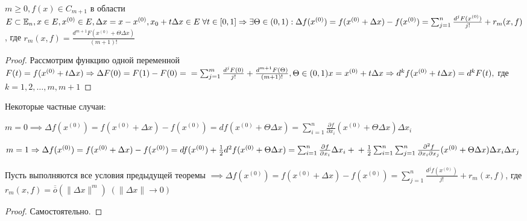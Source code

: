 \documentclass[../main.tex]{subfiles}
\begin{document}
\begin{theorem}
    $m\geqslant 0, f(x)\in C_{m+1}$ в области $E \subset \E_{n}, x\in E, x^{(0)}\in E, \Delta x = x- x^{(0)}, x_{0}+t\Delta x \in E \; \forall t \in [0,1] \\ \implies \exists \Theta \in (0,1): \Delta f(x^{(0)}) = f(x^{(0)}+ \Delta x) - f(x^{(0)}) = \sum_{j=1}^{n} \frac{d^{j}F(x^{(0)})}{j!}+ r_{m}(x,f)$, где $r_{m}(x,f) = \frac{d^{m+1}F(x^{(0)}+\Theta\Delta x)}{(m+1)!}$ 
\end{theorem}
\begin{proof}
    Рассмотрим функцию одной переменной $F(t) = f(x^{(0)}+t\Delta x) \implies \Delta F(0) = F(1)-F(0) =\\= \sum_{j=1}^{m}\frac{d^{j}F(0)}{j!}+ \frac{d^{m+1}F(\Theta)}{(m+1)!},\Theta \in (0,1)\\ x = x^{(0)}+t\Delta x \implies d^{k}f(x^{(0)}+t\Delta x) = d^{k}F(t),$ где $k=1,2,\dots,m,m+1$
\end{proof}
Некоторые частные случаи: 

\noindent $m=0\implies \Delta f(x^{(0)})=f(x^{(0)}+\Delta x)-f(x^{(0)})=df(x^{(0)}+\Theta \Delta x)= \sum_{i    =1}^{n  }\frac{\partial{f}}{\partial{x_{i}}}(x^{(0)}+ \Theta \Delta x)\Delta x_{i} $

\noindent $m=1\implies \Delta f(x^{(0)})=f(x^{(0)}+\Delta x)-f(x^{(0)})=df(x^{(0)})+ \frac{1}{2}d^{2}f(x^{(0)}+\Theta \Delta x) = \sum_{i   =1}^{n  } \frac{\partial{f}}{\partial{x_{i}}}\Delta x_{i}+\\+ \frac{1}{2} \sum_{i  =1}^{n} \sum_{j=1}^{n} \frac{\partial^{2}{f}}{\partial{x_{i}}\partial{x_{j}}} (x^{(0)}+\Theta \Delta x) \Delta x_{i} \Delta x_{j} $  

\begin{corollary}
    Пусть выполняются все условия предыдущей теоремы $\implies \Delta f(x^{(0)}) = f(x^{(0)}+\Delta x) - f(x^{(0)}) = \sum_{j=1}^{n}\frac{d^{j}f(x^{(0)})}{j!}+r_{m}(x,f)$, где $r_{m}(x,f) = \overline{\overline{o}}(\|\Delta x\|^{m}) \; (\| \Delta x\| \to 0)$ 
\end{corollary}
\begin{proof}
    Самостоятельно.
\end{proof}
\end{document}
